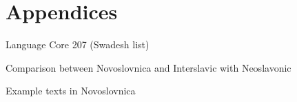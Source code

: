 \chapter{Appendices}

Language Core 207 (Swadesh list)

Comparison between Novoslovnica and Interslavic with Neoslavonic

Example texts in Novoslovnica